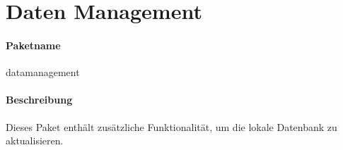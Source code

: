 \newpage
\section{Daten Management}
\paragraph*{Paketname}
datamanagement
\paragraph*{Beschreibung}
Dieses Paket enthält zusätzliche Funktionalität, um die lokale Datenbank zu aktualisieren.

